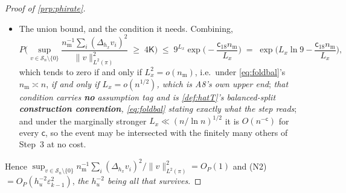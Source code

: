 \begin{proof}[Proof of \cref{prp:phirate}]
\begin{itemize}
\item[--] The union bound, and the condition it needs. Combining,
\[
P\Big(\sup_{v\in\mathcal S_n\setminus\{0\}}\frac{n_{\mathrm m}^{-1}\sum_i(\Delta_{h_x}v_i)^{2}}{\|v\|^{2}_{L^{2}(\pi)}}\;\ge\;4\mathsf K\Big)
\;\le\;9^{L_x}\exp\Big(-\frac{\mathsf c_{18}n_{\mathrm m}}{L_x}\Big)
\;=\;\exp\Big(L_x\ln9-\frac{\mathsf c_{18}n_{\mathrm m}}{L_x}\Big),
\]
which tends to zero if and only if $L_x^{2}=o(n_{\mathrm m})$, i.e.\, under \eqref{eq:foldbal}'s
$n_{\mathrm m}\asymp n$, \emph{if and only if $L_x=o(n^{1/2})$, which is A8's
own upper end}; \emph{that condition carries \textbf{no} assumption tag and is \cref{def:hatT}'s balanced-split
\textbf{construction convention}, \eqref{eq:foldbal} stating exactly what the step reads};
and under the marginally stronger $L_x\ll(n/\ln n)^{1/2}$ it is $O(n^{-\mathsf c})$ for every
$\mathsf c$, so the event may be intersected with the finitely many others of Step~3 at no cost.
\end{itemize}
Hence $\sup_{v\in\mathcal S_n\setminus\{0\}}n_{\mathrm m}^{-1}\sum_i(\Delta_{h_x}v_i)^{2}/\|v\|^{2}_{L^{2}(\pi)}=O_P(1)$
and (N2) $=O_P(h_u^{-2}\varepsilon_{k-1}^{2})$, \emph{the $h_u^{-2}$ being all that survives}.


\end{proof}

